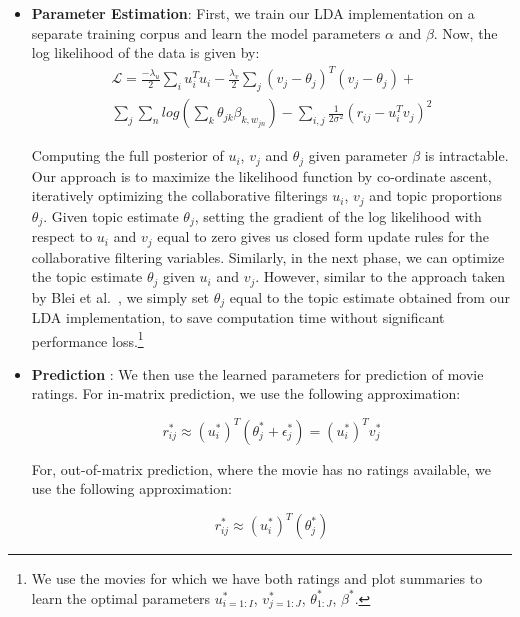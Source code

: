 \documentclass{article} %
\begin{document}
\begin{itemize}[leftmargin=*]

\item[] {\bf Parameter Estimation}: First, we train our LDA implementation on a separate training corpus and learn the model parameters $\alpha$ and $\beta$. 
Now, the log likelihood of the data is given by:
\begin{multline*} 
\mathcal{L} = \frac{-\lambda_{u}}{2}\sum_{i}u_{i}^{T}u_{i} -
		\frac{\lambda_{v}}{2}\sum_{j}(v_{j}-\theta_{j})^{T}(v_{j}-\theta_{j}) + \\
		\sum_{j}\sum_{n}log(\sum_{k}\theta_{jk}\beta_{k,w_{jn}})
		- \sum_{i,j}\frac{1}{2\sigma^{2}}(r_{ij}-u_{i}^{T}v_{j})^{2}
\end{multline*}

Computing the full posterior of $u_{i}$, $v_{j}$ and $\theta_{j}$ given
parameter $\beta$ is intractable. Our approach is to maximize the likelihood
function by co-ordinate ascent, iteratively optimizing the collaborative
filterings {$u_{i}$, $v_{j}$} and topic proportions $\theta_{j}$. Given
topic estimate $\theta_{j}$, setting the gradient of the log likelihood with 
respect to $u_{i}$ and $v_{j}$ equal to zero gives us closed form update rules
for the collaborative filtering variables. Similarly, in the next phase, we can
optimize the topic estimate $\theta_{j}$ given $u_{i}$ and $v_{j}$. However,
similar to the approach taken by Blei et al.~\cite{ctr}, we simply set 
$\theta_{j}$ equal to the topic estimate obtained from our LDA implementation,
to save computation time without significant performance loss.\footnote{We 
use the movies for which we have both ratings and plot summaries to learn
the optimal parameters $u_{i=1:I}^{*}$, $v_{j=1:J}^{*}$, $\theta_{1:J}^{*}$,
$\beta^{*}$.}

\item[] {\bf Prediction} : We then use the learned parameters for prediction
of movie ratings. For in-matrix prediction, we use the following approximation:

\begin{equation} 
r_{ij}^{*} \approx (u_{i}^{*})^{T}(\theta_{j}^{*}+\epsilon_{j}^{*}) = (u_{i}^{*})^{T}v_{j}^{*}
\end{equation}

For, out-of-matrix prediction, where the movie has no ratings available, we use 
the following approximation:

\begin{equation} 
r_{ij}^{*} \approx (u_{i}^{*})^{T}(\theta_{j}^{*})
\end{equation}

\end{itemize}
\end{document}
